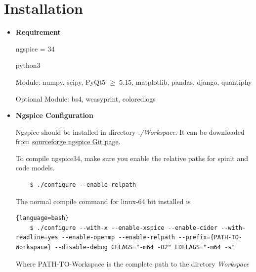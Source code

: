 \documentclass[12pt,a4paper]{article}
\begin{document}
\section{Installation}
\begin{itemize}
    \item \textbf{Requirement}\par
    ngspice = 34\par
    python3\par
    Module: numpy, scipy, PyQt5 $\geqslant$ 5.15, matplotlib, pandas, django, quantiphy\par
    Optional Module: bs4, weasyprint, coloredlogs\par

    \item  \textbf{Ngspice Configuration}\par
    Ngspice should be installed in directory \textit{./Workspace}. It can be downloaded from \href{https://sourceforge.net/projects/ngspice/}{sourceforge ngspice Git page}.

    To compile ngspice34, make sure you enable the relative paths for spinit and code models.
    \begin{lstlisting}
    $ ./configure --enable-relpath
    \end{lstlisting}

    The normal compile command for linux-64 bit installed is
    \begin{lstlisting}{language=bash}
    $ ./configure --with-x --enable-xspice --enable-cider --with-readline=yes --enable-openmp --enable-relpath --prefix={PATH-TO-Workspace} --disable-debug CFLAGS="-m64 -O2" LDFLAGS="-m64 -s"
    \end{lstlisting}
    Where PATH-TO-Workspace is the complete path to the dirctory \textit{Workspace}
\end{itemize}
\end{document}
